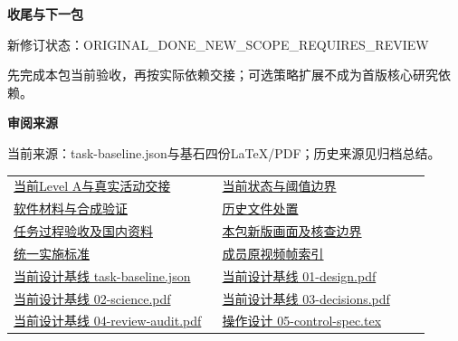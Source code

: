 \documentclass[11pt,a4paper]{article}
\newcommand{\reviewsubsection}[1]{\par\Needspace{4\baselineskip}\vspace{4pt}\begin{center}{\titlelatin\titlecjk\bfseries\fontsize{12}{18}\selectfont #1}\end{center}}
\begin{document}
\reviewsubsection{3.3 收尾与下一包}
新修订状态：ORIGINAL\_\allowbreak{}DONE\_\allowbreak{}NEW\_\allowbreak{}SCOPE\_\allowbreak{}REQUIRES\_\allowbreak{}REVIEW


先完成本包当前验收，再按实际依赖交接；可选策略扩展不成为首版核心研究依赖。


\begin{minipage}{\linewidth}
\reviewsubsection{3.4 审阅来源}
当前来源：task-\allowbreak{}baseline.json与基石四份LaTeX/\allowbreak{}PDF；历史来源见归档总结。


\begingroup\small\setlength{\tabcolsep}{4pt}\begin{tabular}{@{}p{0.48\linewidth}p{0.48\linewidth}@{}}
\href{file:///D:/Agent/srp/agent/tasks/Q-01/outputs/current-level-a.md}{当前Level A与真实活动交接} & \href{file:///D:/Agent/srp/agent/tasks/Q-01/outputs/current-level-a.json}{当前状态与阈值边界}\\[4pt]
\href{file:///D:/Agent/srp/agent/tasks/Q-01/evidence/verification.json}{软件材料与合成验证} & \href{file:///D:/Agent/srp/agent/tasks/Q-01/archive/README.md}{历史文件处置}\\[4pt]
\href{file:///D:/Agent/srp/agent/tasks/Q-01/TASK.md}{任务过程验收及国内资料} & \href{file:///D:/Agent/srp/agent/tasks/Q-01/outputs/current-implementation-evidence.md}{本包新版画面及核查边界}\\[4pt]
\href{file:///D:/Agent/srp/agent/design/weather/2026-10-08_Storm\%E4\%B8\%8E\%E7\%BA\%AF\%E7\%B2\%92\%E5\%AD\%90\%E5\%8F\%8C\%E7\%8E\%AF\%E5\%AE\%9E\%E6\%96\%BD\%E6\%A0\%87\%E5\%87\%86.md}{统一实施标准} & \href{file:///D:/Agent/srp/human/assets/previews/2026-10-08/member-storm-particle-rings/frame-index.json}{成员原视频帧索引}\\[4pt]
\href{file:///D:/Agent/srp/agent/design/design-foundation-20261008/task-baseline.json}{当前设计基线 task-\allowbreak{}baseline.json} & \href{file:///D:/Agent/srp/agent/design/design-foundation-20261008/01-design.pdf}{当前设计基线 01-\allowbreak{}design.pdf}\\[4pt]
\href{file:///D:/Agent/srp/agent/design/design-foundation-20261008/02-science.pdf}{当前设计基线 02-\allowbreak{}science.pdf} & \href{file:///D:/Agent/srp/agent/design/design-foundation-20261008/03-decisions.pdf}{当前设计基线 03-\allowbreak{}decisions.pdf}\\[4pt]
\href{file:///D:/Agent/srp/agent/design/design-foundation-20261008/04-review-audit.pdf}{当前设计基线 04-\allowbreak{}review-\allowbreak{}audit.pdf} & \href{file:///D:/Agent/srp/agent/design/design-foundation-20261008/05-control-spec.tex}{操作设计 05-\allowbreak{}control-\allowbreak{}spec.tex}\\[4pt]

\end{tabular}
\end{minipage}
\end{document}
